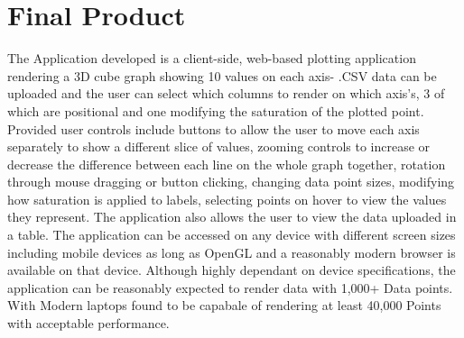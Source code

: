 \section{Final Product}
The Application developed is a client-side, web-based plotting application rendering a 3D cube graph showing 10 values on each axis- .CSV data can be uploaded and the user can select which columns to render on which axis's, 3 of which are positional and one modifying the saturation of the plotted point.
Provided user controls include buttons to allow the user to move each axis separately to show a different slice of values, zooming controls to increase or decrease the difference between each line on the whole graph together, rotation through mouse dragging or button clicking, changing data point sizes, modifying how saturation is applied to labels, selecting points on hover to view the values they represent. The application also allows the user to view the data uploaded in a table.
The application can be accessed on any device with different screen sizes including mobile devices as long as OpenGL and a reasonably modern browser is available on that device. Although highly dependant on device specifications, the application can be reasonably expected to render data with 1,000+ Data points. With Modern laptops found to be capabale of rendering at least 40,000 Points with acceptable performance.